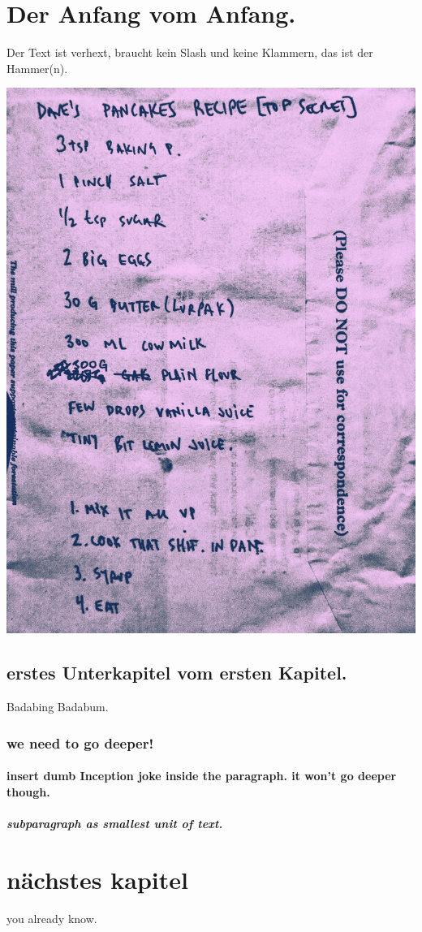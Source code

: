 \documentclass{article}
\begin{document}
    \tableofcontents
    
    \section{Der Anfang vom Anfang.}
    Der Text ist verhext, braucht kein Slash und keine Klammern, 
    das ist der Hammer(n).

    \includegraphics[width=0.5\linewidth]{graphics/DAVES_PANCAKES_RECIPE.jpg}

        \subsection {erstes Unterkapitel vom ersten Kapitel.}
        Badabing Badabum.

            \subsubsection{we need to go deeper!}

                \paragraph{insert dumb Inception joke inside the paragraph. it won't go deeper though.} 
                   
                    \subparagraph{subparagraph as smallest unit of text.}

    \section{nächstes kapitel}
    you already know. 

    
\end{document}
